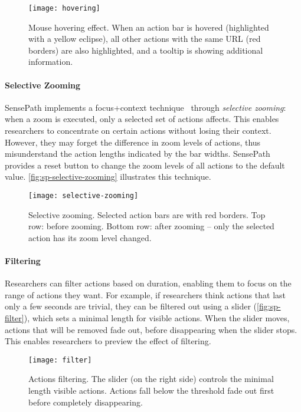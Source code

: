 \begin{figure}
\centering
\texttt{[image: hovering]}
\caption[Mouse hovering effect]{Mouse hovering effect. When an action bar is hovered (highlighted with a yellow eclipse), all other actions with the same URL (red borders) are also highlighted, and a tooltip is showing additional information.}
\label{fig:sp-hovering}
\end{figure}

\paragraph{Selective Zooming}
SensePath implements a focus+context technique~\cite{Cockburn2008} through \emph{selective zooming}: when a zoom is executed, only a selected set of actions affects. This enables researchers to concentrate on certain actions without losing their context. However, they may forget the difference in zoom levels of actions, thus misunderstand the action lengths indicated by the bar widths. SensePath provides a reset button to change the zoom levels of all actions to the default value. \autoref{fig:sp-selective-zooming} illustrates this technique.

\begin{figure}
\centering
\texttt{[image: selective-zooming]}
\caption[Selective zooming]{Selective zooming. Selected action bars are with red borders. Top row: before zooming. Bottom row: after zooming -- only the selected action has its zoom level changed.}
\label{fig:sp-selective-zooming}
\end{figure}

\paragraph{Filtering}
Researchers can filter actions based on duration, enabling them to focus on the range of actions they want. For example, if researchers think actions that last only a few seconds are trivial, they can be filtered out using a slider (\autoref{fig:sp-filter}), which sets a minimal length for visible actions. When the slider moves, actions that will be removed fade out, before disappearing when the slider stops. This enables researchers to preview the effect of filtering.

\begin{figure}
\centering
\texttt{[image: filter]}
\caption[Actions filtering]{Actions filtering. The slider (on the right side) controls the minimal length visible actions. Actions fall below the threshold fade out first before completely disappearing.}
\label{fig:sp-filter}
\end{figure}

